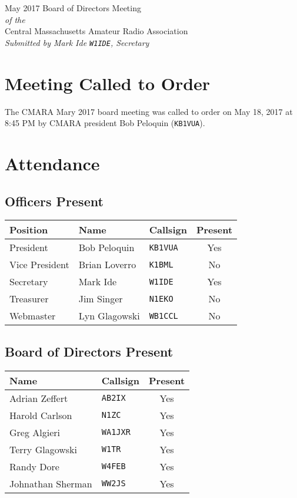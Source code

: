 \documentclass[10pt,letterpaper]{article}
\begin{document}
\begin{center}
{\huge May 2017 Board of Directors Meeting}\\
\emph{of the}\\
{\Large Central Massachusetts Amateur Radio Association}\\
\emph{Submitted by Mark Ide \texttt{W1IDE}, Secretary}
\end{center}

\section{Meeting Called to Order}
The CMARA Mary 2017 board meeting was called to order on May 18, 2017 at 8:45 PM by CMARA president Bob Peloquin (\texttt{KB1VUA}).

\section{Attendance}

\subsection{Officers Present}
\begin{tabular}{|l|l|l|c|}
  \hline
  \textbf{Position} & \textbf{Name}  & \textbf{Callsign} & \textbf{Present} \\ \hline
  President         & Bob Peloquin   & \texttt{KB1VUA}   & Yes \\
  Vice President    & Brian Loverro  & \texttt{K1BML}    & No \\
  Secretary         & Mark Ide       & \texttt{W1IDE}    & Yes \\
  Treasurer         & Jim Singer     & \texttt{N1EKO}    & No \\
  Webmaster         & Lyn Glagowski  & \texttt{WB1CCL}   & No \\
  \hline
\end{tabular}

\subsection{Board of Directors Present}
\begin{tabular}{|l|l|c|}
  \hline
  \textbf{Name}     & \textbf{Callsign} & \textbf{Present} \\ \hline
  Adrian Zeffert    & \texttt{AB2IX}    & Yes \\
  Harold Carlson    & \texttt{N1ZC}     & Yes \\
  Greg Algieri      & \texttt{WA1JXR}   & Yes \\
  Terry Glagowski   & \texttt{W1TR}     & Yes \\
  Randy Dore        & \texttt{W4FEB}    & Yes \\
  Johnathan Sherman & \texttt{WW2JS}    & Yes \\
  \hline
\end{tabular}
\end{document}
